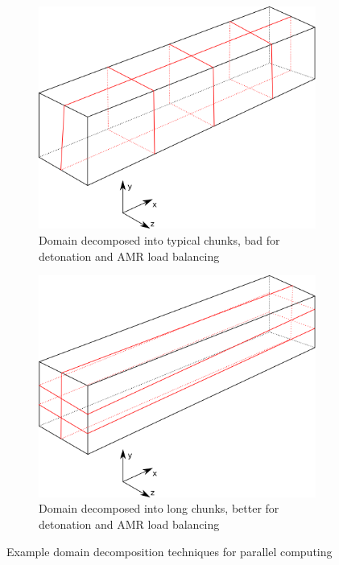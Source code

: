 \begin{figure}[]
    \centering
    \begin{subfigure}[]{0.7\textwidth}
        \centering
        \includegraphics[width=\textwidth]{./figs/parallel_short.png}
        \caption{Domain decomposed into typical chunks, bad for detonation and AMR load balancing}
        \label{sfig:shortdecomp}
    \end{subfigure}

    \begin{subfigure}[]{0.7\textwidth}
        \centering
        \includegraphics[width=\textwidth]{./figs/parallel_long.png}
        \caption{Domain decomposed into long chunks, better for detonation and AMR load balancing}
        \label{sfig:longdecomp}
    \end{subfigure}
    \caption{Example domain decomposition techniques for parallel computing}
    \label{fig:decomp}
\end{figure}%
